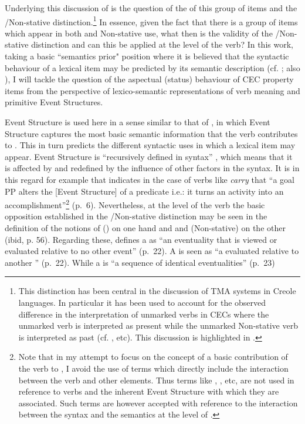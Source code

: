 Underlying this discussion of  is the question of the
 of this group of items and the \slash Non-stative
distinction.\footnote{This distinction has been central in the
  discussion of TMA systems in Creole languages.  In particular it has
  been used to account for the observed difference in the 
  interpretation of unmarked verbs in CECs where the unmarked 
  verb is interpreted as present while the unmarked Non-stative verb
  is interpreted as past (cf. \citealt{Bickerton1975,Winford1993}, etc). 
  This discussion is highlighted in .}
  In essence, given the fact that there is a group of
items which appear in both  and Non-stative use, what then is
the validity of the \slash Non-stative distinction and can this be
applied at the level of the verb?  In this work, taking a basic
``semantics prior" position where it is believed that the syntactic
behaviour of a lexical item may be predicted by its semantic
description (cf. \citealt{Dixon1977}; also \citealt{Levin1993}), I
will tackle the question of the aspectual (status) behaviour of CEC
property items from the perspective of lexico-semantic representations
of verb meaning and primitive Event Structures.

Event Structure is used here in a sense similar to that
of \citet{Pustejovsky1988,Pustejovsky1991},  in which Event Structure captures the most basic semantic information that the verb contributes to . This in turn predicts the different syntactic uses in which a lexical item may appear.
Event Structure is ``recursively defined in syntax'' \citet[55]{Pustejovsky1991}, which means that it is affected by and redefined by the influence of other factors in the syntax.  It is in this regard for example that \citet{MacDonald2008} indicates in the case of verbs like
\textit{carry}  that ``a goal PP alters the [Event Structure] of a predicate
i.e.: it turns an activity into an accomplishment''\footnote{Note that
  in my attempt to focus on the concept of a basic contribution of the
  verb to , I avoid the use of terms which directly include the
  interaction between the verb and other elements. Thus terms like
  , ,  etc, are not used in reference
  to verbs and the inherent Event Structure with which they are
  associated. Such terms are however accepted with reference to the
  interaction between the syntax and the semantics at the level of
  .} (p.~6).  Nevertheless, at the level of the verb
the basic opposition established in the \slash Non-stative
distinction may be seen in the definition of the notions of 
() on one hand and  and  (Non-stative) on the
other (ibid, p. 56).  Regarding these, \citet{Pustejovsky1988} defines
a  as ``an eventuality that is viewed or evaluated relative to no
other event'' (p.~22).  A  is seen as ``a 
evaluated relative to another '' (p.~22).  While a
 is ``a sequence of identical eventualities'' (p.~23)

